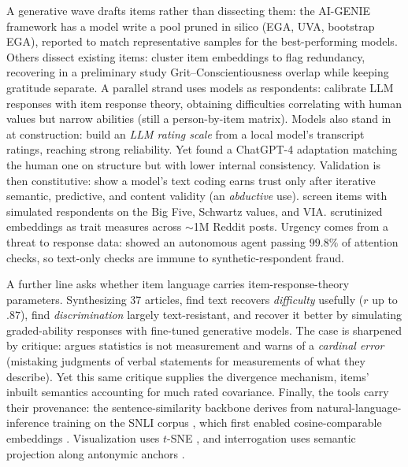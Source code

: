 A generative wave drafts items rather than dissecting them: the AI-GENIE framework
\citep{russell-lasalandra-etal-2026} has a model write a pool pruned in silico
(EGA, UVA, bootstrap EGA), reported to match representative samples for the
best-performing models. Others dissect existing items: \citet{huang-etal-2025}
cluster item embeddings to flag redundancy, recovering in a preliminary study
Grit--Conscientiousness overlap while keeping gratitude separate. A parallel strand
uses models as respondents: \citet{liu-etal-2025} calibrate LLM responses with item
response theory, obtaining difficulties correlating with human values but narrow
abilities (still a person-by-item matrix). Models also stand in at construction:
\citet{eberhardt-etal-2025} build an
\emph{LLM rating scale} from a local model's transcript ratings, reaching strong
reliability. Yet \citet{grobelny-etal-2025} found a ChatGPT-4 adaptation matching
the human one on structure but with lower internal consistency. Validation is then
constitutive: \citet{bunt-etal-2025} show a model's text coding earns trust only
after iterative semantic, predictive, and content validity (an \emph{abductive}
use). \citet{lim-etal-2025} screen items with
simulated respondents on the Big Five, Schwartz values, and VIA.
\citet{maharjan-etal-2025} scrutinized embeddings as trait measures across
$\sim$1M Reddit posts. Urgency comes from a threat to response data:
\citet{westwood-2025} showed an autonomous agent passing $99.8\%$ of attention
checks, so text-only checks are immune to synthetic-respondent fraud.

A further line asks whether item language carries item-response-theory parameters.
Synthesizing 37 articles, \citet{peters-etal-2025} find text recovers
\emph{difficulty} usefully ($r$ up to $.87$), \citet{han-etal-2025} find
\emph{discrimination} largely text-resistant, and \citet{ormerod-2026} recover it
better by simulating graded-ability responses with fine-tuned generative models. The case is sharpened by critique: \citet{uher-2025}
argues statistics is not measurement and warns of a \emph{cardinal error} (mistaking
judgments of verbal statements for measurements of what they describe). Yet this same
critique supplies the divergence mechanism, items' inbuilt semantics accounting for
much rated covariance. Finally, the tools carry their provenance: the
sentence-similarity backbone derives from natural-language-inference training on the
SNLI corpus \citep{bowman-etal-2015}, which first enabled cosine-comparable
embeddings \citep{reimers-gurevych-2019}. Visualization uses $t$-SNE
\citep{vandermaaten-hinton-2008}, and interrogation uses semantic projection along
antonymic anchors \citep{grand-etal-2022}.
